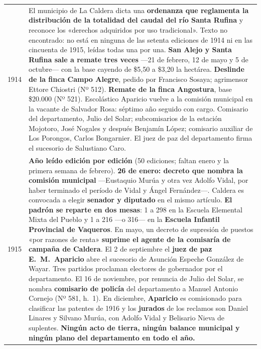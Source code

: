 \begin{longtable}{@{}p{2.7cm}p{10.3cm}@{}}
1914 & El municipio de La Caldera dicta una \textbf{ordenanza que reglamenta la distribución de la totalidad del caudal del río Santa Rufina} y reconoce los «derechos adquiridos por uso tradicional». Texto no encontrado: no está en ninguna de las setenta ediciones de 1914 ni en las cincuenta de 1915, leídas todas una por una. \textbf{San Alejo y Santa Rufina sale a remate tres veces} ---21 de febrero, 12 de mayo y 5 de octubre--- con la base cayendo de \$5,50 a \$3,20 la hectárea. \textbf{Deslinde de la finca Campo Alegre}, pedido por Francisco Sosaya; agrimensor Ettore Chiostri (Nº 512). \textbf{Remate de la finca Angostura}, base \$20.000 (Nº 521). Escolástico Aparicio\index{Aparicio, Escolástico M.} vuelve a la comisión municipal en la vacante de Salvador Rosa\index{Rosa, Salvador}: séptimo año seguido con cargo. Comisario del departamento, Julio del Solar; subcomisarios de la estación Mojotoro, José Nogales y después Benjamín López; comisario auxiliar de Los Porongos, Carlos Bongarnier. El juez de paz del departamento firma el sucesorio de Salustiano Caro. \\
1915 & \textbf{Año leído edición por edición} (50 ediciones; faltan enero y la primera semana de febrero). \textbf{26 de enero: decreto que nombra la comisión municipal} ---Eustaquio Murúa\index{Murúa, Eustaquio} y otra vez Adolfo Vidal, por haber terminado el período de Vidal y Ángel Fernández---. Caldera es convocada a elegir \textbf{senador y diputado} en el mismo artículo. \textbf{El padrón se reparte en dos mesas}: 1 a 298 en la Escuela Elemental Mixta del Pueblo y 1 a 216 ---o 316--- en la \textbf{Escuela Infantil Provincial de Vaqueros}. En mayo, un decreto de supresión de puestos «por razones de renta» \textbf{suprime el agente de la comisaría de campaña de Caldera}. El 2 de septiembre el \textbf{juez de paz E.\ M.\ Aparicio}\index{Aparicio, Escolástico M.} abre el sucesorio de Asunción Espeche González de Wayar. Tres partidos proclaman electores de gobernador por el departamento. El 16 de noviembre, por renuncia de Julio del Solar, se nombra \textbf{comisario de policía} del departamento a Manuel Antonio Cornejo (Nº 581, h.\ 1). En diciembre, \textbf{Aparicio}\index{Aparicio, Escolástico M.} es comisionado para clasificar las patentes de 1916 y los \textbf{jurados} de los reclamos son Daniel Linares\index{Linares, Daniel} y Silvano Murúa\index{Murúa, Silvano Ignacio}, con Adolfo Vidal y Belisario Nieva de suplentes. \textbf{Ningún acto de tierra, ningún balance municipal y ningún plano del departamento en todo el año.} \\

\end{longtable}
